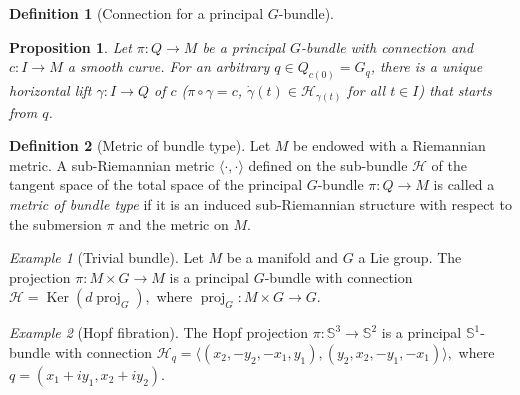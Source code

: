 \documentclass [xcolor=svgnames, t] {beamer}
\theoremstyle{definition}
\newtheorem{df}{Definition}
\theoremstyle{plain}
\newtheorem{prop}{Proposition}
\theoremstyle{remark}
\newtheorem{ex}{Example}
\begin{document}
\begin{frame}
\begin{df}[Connection for a principal $ G $-bundle]
\end{df}
\begin{prop}
	Let $ \pi: Q \rightarrow M $ be a principal $ G $-bundle with connection and $ c: I \rightarrow M $ a smooth curve. For an arbitrary $ q\in Q_{c(0)}= G_q $, there is a unique horizontal lift $ \gamma: I \rightarrow Q $ of $ c $ ($\pi\circ\gamma =c$, $ \dot{\gamma}(t)\in \mathcal{H}_{\gamma(t)} $ for all $ t\in I $) that starts from $ q $.    	
\end{prop}
\begin{df}[Metric of bundle type]
	Let $ M $ be endowed with a Riemannian metric. A sub-Riemannian metric $  \langle\cdot,\cdot\rangle $ defined on the sub-bundle $ \mathcal{H} $  of the tangent space of the total space of the principal $ G $-bundle $ \pi: Q \rightarrow {M}
	$ is called a \textit{metric of bundle type} if it is an induced sub-Riemannian structure with respect to the submersion $ \pi $ and the metric on $ M $.
\end{df}
\begin{ex}[Trivial bundle]
	Let $ M $ be a manifold and $ G $ a Lie group. The projection $ \pi: M \times G \rightarrow M $ is a principal $ G $-bundle with connection $ \mathcal{H}= \operatorname{Ker}(  d \operatorname{proj}_G), $ 	where $ \operatorname{proj}_G : M\times G \rightarrow G. $ 
\end{ex}
\begin{ex}[Hopf fibration]
	The Hopf projection $ \pi: \mathbb{S}^3 \rightarrow \mathbb{S}^2 $ is a principal $ \mathbb{S}^1  $-bundle with connection $ \mathcal{H}_{q} = \langle(x_2,-y_2,-x_1,y_1),(y_2,x_2,-y_1,-x_1)\rangle,  $ where  	$ q=(x_1+iy_1, x_2+iy_2). $   
\end{ex}
\end{frame}
\end{document}
